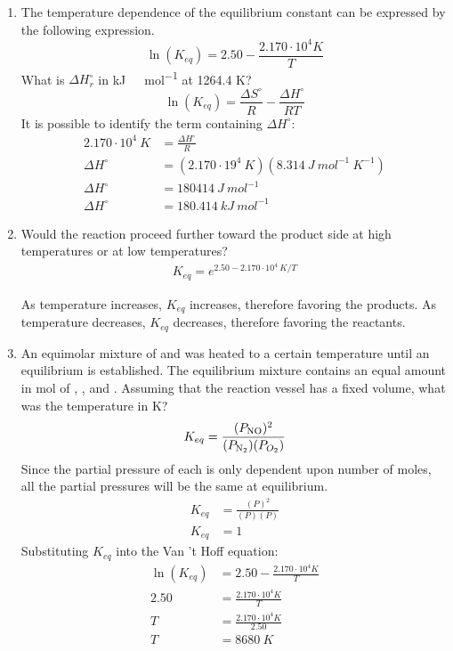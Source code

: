 \documentclass{article}
\begin{document}
\begin{enumerate}
    \item The temperature dependence of the equilibrium constant can be
        expressed by the following expression. 
    $$\ln(K_{eq})=2.50-\frac{2.170\cdot10^{4} \si{K}}{T}$$
    What is $\Delta H^{\circ}_{r}$ in \si{kJ\ mol^{-1}} at 1264.4 \si{K}?
    $$\ln(K_{eq})=\frac{\Delta S^{\circ}}{R}-\frac{\Delta H^{\circ}}{RT}$$
    It is possible to identify the term containing $\Delta H^{\circ}$:
    \begin{align*}
        2.170\cdot10^4\ \si{K}&=\frac{\Delta H^{\circ}}{R}\\
        \Delta H^{\circ}&=(2.170\cdot19^{4}\ \si{K})(8.314\ \si{J\ mol^{-1}\
    K^{-1}})\\
        \Delta H^{\circ}&=180414\ \si{J\ mol^{-1}}\\
        \Delta H^{\circ}&=180.414\ \si{kJ\ mol^{-1}}
    \end{align*}
    
    \item Would the reaction proceed further toward the product side at high
        temperatures or at low temperatures?
    \begin{align*}
        K_{eq}=e^{2.50-2.170\cdot10^{4}\ \si{K}/T}
    \end{align*}
    
    As temperature increases, $K_{eq}$ increases, therefore favoring the
    products. As temperature decreases, $K_{eq}$ decreases, therefore favoring
    the reactants.
    
    \item An equimolar mixture of  and  was heated to
        a certain temperature until an equilibrium is established. The
        equilibrium mixture contains an equal amount in \si{mol} of
        \ce{N_{2(g)}}, \ce{O_{2(g)}}, and \ce{NO_{(g)}}. Assuming that the
        reaction vessel has a fixed volume, what was the temperature in \si{K}?
    \begin{align*}
        K_{eq}=\frac{(P_{\ce{NO}})^{2}}{(P_{\ce{N_{2}}})(P_{O_{2}})}
    \end{align*}
    Since the partial pressure of each is only dependent upon number of moles,
    all the partial pressures will be the same at equilibrium.
    \begin{align*}
        K_{eq}&=\frac{(P)^{2}}{(P)(P)}\\
        K_{eq}&=1
    \end{align*}
    Substituting $K_{eq}$ into the Van 't Hoff equation:
    \begin{align*}
        \ln(K_{eq})&=2.50-\frac{2.170\cdot10^{4} \si{K}}{T}\\
        2.50&=\frac{2.170\cdot10^{4} \si{K}}{T}\\
        T&=\frac{2.170\cdot10^{4} \si{K}}{2.50}\\
        T&=8680\ \si{K}
    \end{align*}
    

\end{enumerate}
\end{document}

